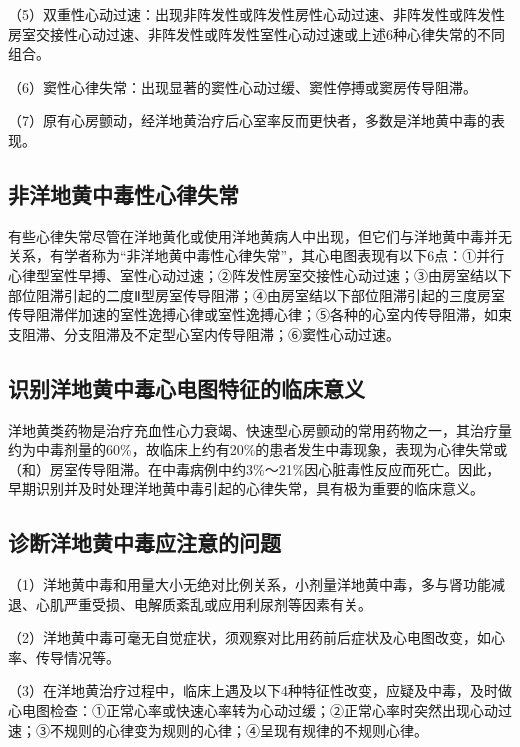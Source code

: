 （5）双重性心动过速：出现非阵发性或阵发性房性心动过速、非阵发性或阵发性房室交接性心动过速、非阵发性或阵发性室性心动过速或上述6种心律失常的不同组合。

（6）窦性心律失常：出现显著的窦性心动过缓、窦性停搏或窦房传导阻滞。

（7）原有心房颤动，经洋地黄治疗后心室率反而更快者，多数是洋地黄中毒的表现。

\protect\hypertarget{text00054.htmlux5cux23subid649}{}{}

\subsection{非洋地黄中毒性心律失常}

有些心律失常尽管在洋地黄化或使用洋地黄病人中出现，但它们与洋地黄中毒并无关系，有学者称为“非洋地黄中毒性心律失常”，其心电图表现有以下6点：①并行心律型室性早搏、室性心动过速；②阵发性房室交接性心动过速；③由房室结以下部位阻滞引起的二度Ⅱ型房室传导阻滞；④由房室结以下部位阻滞引起的三度房室传导阻滞伴加速的室性逸搏心律或室性逸搏心律；⑤各种的心室内传导阻滞，如束支阻滞、分支阻滞及不定型心室内传导阻滞；⑥窦性心动过速。

\protect\hypertarget{text00054.htmlux5cux23subid650}{}{}

\subsection{识别洋地黄中毒心电图特征的临床意义}

洋地黄类药物是治疗充血性心力衰竭、快速型心房颤动的常用药物之一，其治疗量约为中毒剂量的60\%，故临床上约有20\%的患者发生中毒现象，表现为心律失常或（和）房室传导阻滞。在中毒病例中约3\%～21\%因心脏毒性反应而死亡。因此，早期识别并及时处理洋地黄中毒引起的心律失常，具有极为重要的临床意义。

\protect\hypertarget{text00054.htmlux5cux23subid651}{}{}

\subsection{诊断洋地黄中毒应注意的问题}

（1）洋地黄中毒和用量大小无绝对比例关系，小剂量洋地黄中毒，多与肾功能减退、心肌严重受损、电解质紊乱或应用利尿剂等因素有关。

（2）洋地黄中毒可毫无自觉症状，须观察对比用药前后症状及心电图改变，如心率、传导情况等。

（3）在洋地黄治疗过程中，临床上遇及以下4种特征性改变，应疑及中毒，及时做心电图检查：①正常心率或快速心率转为心动过缓；②正常心率时突然出现心动过速；③不规则的心律变为规则的心律；④呈现有规律的不规则心律。

